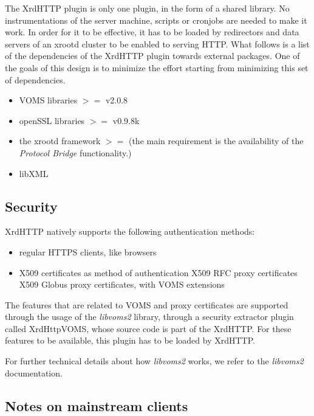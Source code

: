 \documentclass[12pt]{article} %
\begin{document}
The XrdHTTP plugin is only one plugin, in the form of a shared library. No instrumentations of the server machine, scripts or cronjobs are needed to make it work. In order for it to be effective, it has to be loaded by redirectors and data servers of an xrootd cluster to be enabled to serving HTTP. What follows is a list of the dependencies of the XrdHTTP plugin towards external packages. One of the goals of this design is to minimize the effort starting from minimizing this set of dependencies.\\

\begin{itemize}
 \item VOMS libraries $>=$ v2.0.8
 \item openSSL libraries $>=$ v0.9.8k
 \item the xrootd framework $>=$ (the main  requirement is the availability of the \textit{Protocol Bridge} functionality.)
 \item libXML
\end{itemize}


\subsection{Security}

XrdHTTP natively supports the following authentication methods:

\begin{itemize}
\item regular HTTPS clients, like browsers
\item X509 certificates as method of authentication
\subitem X509 RFC proxy certificates
\subitem X509 Globus proxy certificates, with VOMS extensions
\end{itemize}

The features that are related to VOMS and proxy certificates are supported through the usage of the \textit{libvoms2} library, through a security extractor plugin called XrdHttpVOMS, whose source code is part of the XrdHTTP. For these features to be available, this plugin has to be loaded by XrdHTTP.

For further technical details about how \textit{libvoms2} works, we refer to the \textit{libvoms2} documentation.

\subsection{Notes on mainstream clients}
\end{document}
